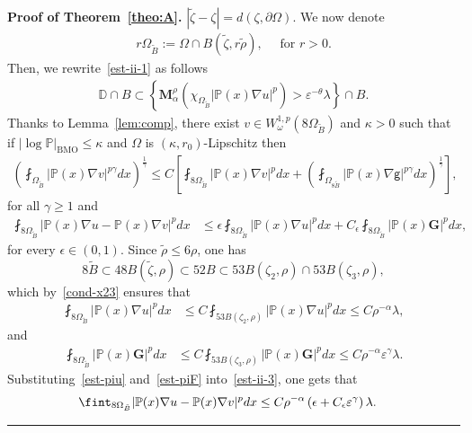 \documentclass[a4paper, 11pt]{article}
\newenvironment{proof}[1][Proof]{\textbf{#1.} }{\hfill\rule{0.5em}{0.5em}}
\begin{document}
\begin{proof}[Proof of Theorem~\ref{theo:A}]
$|\tilde{\zeta}-\zeta| = d(\zeta, \partial \Omega)$. We now denote
\begin{align*}
r\Omega_{\tilde{B}} := \Omega \cap B(\tilde{\zeta},r\tilde{\rho}), \quad \mbox{ for } r>0.
\end{align*}
Then, we rewrite~\eqref{est-ii-1} as follows
\begin{align}\label{est-ii-1c}
\mathbb{D}\cap B \subset \left\{\mathbf{M}_{\alpha}^{\rho}(\chi_{\Omega_{\tilde{B}}}|\mathbb{P}(x)\nabla u|^{p}) > \varepsilon^{-\theta}\lambda\right\} \cap B.
\end{align}
Thanks to Lemma~\ref{lem:comp}, there exist $v \in W^{1,p}_{\omega}(8\Omega_{\tilde{B}})$ and $\kappa>0$ such that if $|\log \mathbb{P}|_{\mathrm{BMO}} \le \kappa$ and $\Omega$ is $(\kappa,r_0)$-Lipschitz  then
\begin{align}\label{est-ii-2}
\left(\fint_{\Omega_{\tilde{B}}} |\mathbb{P}(x)\nabla v|^{p\gamma}dx\right)^{\frac{1}{\gamma}} \le C \left[\fint_{8\Omega_{\tilde{B}}} |\mathbb{P}(x)\nabla v|^{p} dx + \left(\fint_{\Omega_{8\tilde{B}}} |\mathbb{P}(x)\nabla \mathsf{g}|^{p\gamma}dx\right)^{\frac{1}{\gamma}}\right],
\end{align}
for all $\gamma \ge 1$ and
\begin{align}\label{est-ii-3}
\fint_{8\Omega_{\tilde{B}}} |\mathbb{P}(x)\nabla u - \mathbb{P}(x)\nabla v|^p dx & \le \epsilon \fint_{8\Omega_{\tilde{B}}} |\mathbb{P}(x)\nabla u|^{p}dx   + C_{\epsilon} \fint_{8\Omega_{\tilde{B}}} |\mathbb{P}(x)\mathbf{G}|^{p}dx,
\end{align}
for every $\epsilon \in (0,1)$. Since $\tilde{\rho} \le 6\rho$, one has
$$8\tilde{B} \subset 48 B(\tilde{\zeta},\rho) \subset 52 B \subset 53 B(\zeta_2,\rho) \cap 53 B(\zeta_3,\rho),$$ 
which by~\eqref{cond-x23} ensures that 
\begin{align}\label{est-piu}
\fint_{8\Omega_{\tilde{B}}} |\mathbb{P}(x)\nabla u|^{p}dx & \le C \fint_{53 B(\zeta_2,\rho)} |\mathbb{P}(x)\nabla u|^{p}dx \le C \rho^{-\alpha} \lambda,
\end{align}
and
\begin{align}\label{est-piF}
\fint_{8\Omega_{\tilde{B}}} |\mathbb{P}(x) \mathbf{G}|^{p}dx & \le C \fint_{53 B(\zeta_3,\rho)} |\mathbb{P}(x)\mathbf{G}|^{p}dx \le C \rho^{-\alpha} \varepsilon^{\gamma} \lambda.
\end{align}
Substituting~\eqref{est-piu} and~\eqref{est-piF} into~\eqref{est-ii-3}, one gets that
\begin{align}
 \fint_{8\Omega_{\tilde{B}}} |\mathbb{P}(x)\nabla u - \mathbb{P}(x)\nabla v|^p dx  & \le C \rho^{-\alpha} \left(\epsilon + C_{\epsilon} \varepsilon^{\gamma}\right) \lambda.\notag 

\end{align}
\end{proof}
\end{document}
